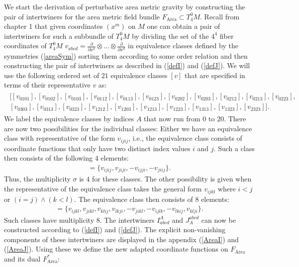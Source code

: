 We start the derivation of perturbative area metric gravity by constructing the pair of intertwiners for the area metric field bundle $F_{\text{Area}} \subset T^0_4M$. Recall from chapter 1 that given coordinates $(x^m)$ on $M$ one can obtain a pair of intertwiners for such a subbundle of $T^0_4M$ by dividing the set of the $4^4$ fiber coordinates of $T^0_4M$ $v_{abcd}=\frac{\partial}{\partial x^a} \otimes ... \otimes \frac{\partial}{\partial x^d}$ in equivalence classes defined by the symmetries (\ref{areaSym}) sorting them according to some order relation and then constructing the pair of intertwiners as described in (\ref{defI}) and (\ref{defJ}). We will use the following ordered set of $21$ equivalence classes $[v]$ that are specified in terms of their representative $v$ as:
\begin{align}
\begin{aligned}
    \bigl [ [v_{0101}], [v_{0102}], [v_{0103}], [v_{0112}], [v_{0113}], [v_{0123}], [v_{0202}], [v_{0203}], [v_{0212}], [v_{0213}], [v_{0223}],\\
     [v_{0303}], [v_{0313}], [v_{0323}], [v_{1212}], [v_{1203}], [v_{1213}], [v_{1223}], [v_{1313}], [v_{1323}], [v_{2323}]  \bigr ].
\end{aligned}
\end{align}
We label the equivalence classes by indices $A$ that now run from $0$ to $20$.
There are now two possibilities for the individual classes: Either we have an equivalence class with representative of the form $v_{ijij}$, i.e., the equivalence class consists of coordinate functions that only have two distinct index values $i$ and $j$. Such a class then consists of the following $4$ elements:
\begin{align}
    [v_{ijij}] = \{ v_{ijij}, v_{jiji}, -v_{ijji}, -v_{jiij} \}.
\end{align}
Thus, the multiplicity $\sigma$ is $4$ for these classes.
The other possibility is given when the representative of the equivalence class takes the general form $v_{ijkl}$ where $i<j$ or $(i=j) \land (k<l)$. The equivalence class then consists of $8$ elements:
\begin{align}
    [v_{ijkl}] = \{v_{ijkl},v_{jikl}, v_{klij}, v_{lkji}, -v_{jikl}, -v_{ijlk}, -v_{lkij}, v_{klji} \}.
\end{align}
Such classes have multiplicity 8. The intertwiners $I^A_{abcd}$ and $J_A^{abcd}$ can now be constructed according to (\ref{defI}) and (\ref{defJ}). The explicit non-vanishing components of these intertwiners are displayed in the appendix (\ref{AreaI}) and (\ref{AreaJ}). Using these we define the new adapted coordinate functions on $F_{\text{Area}}$ and its dual $F_{\text{Area}}^{\ast}$:
